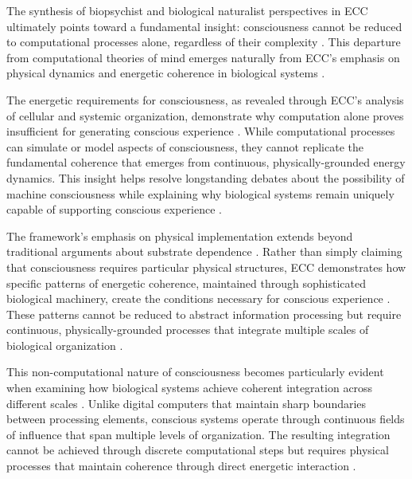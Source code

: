 The synthesis of biopsychist and biological naturalist perspectives in ECC ultimately points toward a fundamental insight: consciousness cannot be reduced to computational processes alone, regardless of their complexity \cite{thompson2010mind}. This departure from computational theories of mind emerges naturally from ECC's emphasis on physical dynamics and energetic coherence in biological systems \cite{searle2017biological}.

The energetic requirements for consciousness, as revealed through ECC's analysis of cellular and systemic organization, demonstrate why computation alone proves insufficient for generating conscious experience \cite{varela1997patterns}. While computational processes can simulate or model aspects of consciousness, they cannot replicate the fundamental coherence that emerges from continuous, physically-grounded energy dynamics. This insight helps resolve longstanding debates about the possibility of machine consciousness while explaining why biological systems remain uniquely capable of supporting conscious experience \cite{lyon2015cognitive}.

The framework's emphasis on physical implementation extends beyond traditional arguments about substrate dependence \cite{edwards2005consciousness,polger2016multiple}. Rather than simply claiming that consciousness requires particular physical structures, ECC demonstrates how specific patterns of energetic coherence, maintained through sophisticated biological machinery, create the conditions necessary for conscious experience \cite{shapiro2007bacteria}. These patterns cannot be reduced to abstract information processing but require continuous, physically-grounded processes that integrate multiple scales of biological organization \cite{van2006principles}.

This non-computational nature of consciousness becomes particularly evident when examining how biological systems achieve coherent integration across different scales \cite{margulis2000life}. Unlike digital computers that maintain sharp boundaries between processing elements, conscious systems operate through continuous fields of influence that span multiple levels of organization. The resulting integration cannot be achieved through discrete computational steps but requires physical processes that maintain coherence through direct energetic interaction \cite{godfrey2016other}.